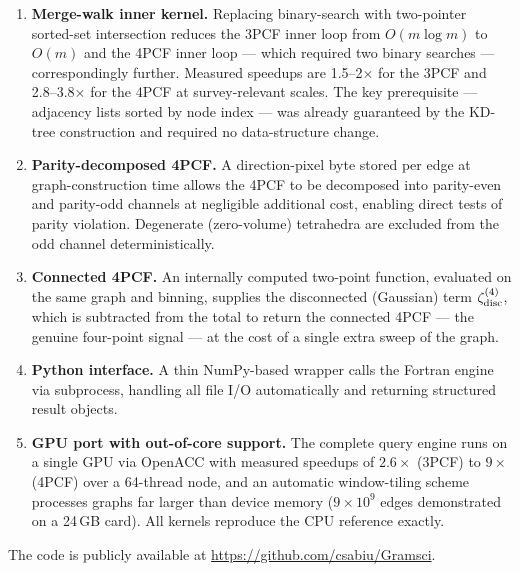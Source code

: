 \documentclass[twocolumn]{aastex701}
\begin{document}
\begin{enumerate}
\item \textbf{Merge-walk inner kernel.}  Replacing binary-search with
  two-pointer sorted-set intersection reduces the 3PCF inner loop from
  $O(m\log m)$ to $O(m)$ and the 4PCF inner loop --- which required two
  binary searches --- correspondingly further.  Measured speedups are
  1.5--2$\times$ for the 3PCF and 2.8--3.8$\times$ for the 4PCF at
  survey-relevant scales.  The key prerequisite --- adjacency lists sorted
  by node index --- was already guaranteed by the KD-tree construction and
  required no data-structure change.
\item \textbf{Parity-decomposed 4PCF.}  A direction-pixel byte stored per
  edge at graph-construction time allows the 4PCF to be decomposed into
  parity-even and parity-odd channels at negligible additional cost,
  enabling direct tests of parity violation.  Degenerate (zero-volume)
  tetrahedra are excluded from the odd channel deterministically.
\item \textbf{Connected 4PCF.}  An internally computed two-point function,
  evaluated on the same graph and binning, supplies the disconnected
  (Gaussian) term $\zeta^{(4)}_{\rm disc}$, which is subtracted from the
  total to return the connected 4PCF --- the genuine four-point signal ---
  at the cost of a single extra sweep of the graph.
\item \textbf{Python interface.}  A thin NumPy-based wrapper calls the
  Fortran engine via subprocess, handling all file I/O automatically and
  returning structured result objects.
\item \textbf{GPU port with out-of-core support.}  The complete query
  engine runs on a single GPU via OpenACC with measured speedups of
  $2.6\times$ (3PCF) to $9\times$ (4PCF) over a 64-thread node, and an
  automatic window-tiling scheme processes graphs far larger than device
  memory ($9\times10^9$ edges demonstrated on a 24\,GB card).  All kernels
  reproduce the CPU reference exactly.
\end{enumerate}

The code is publicly available at \url{https://github.com/csabiu/Gramsci}.
\end{document}
